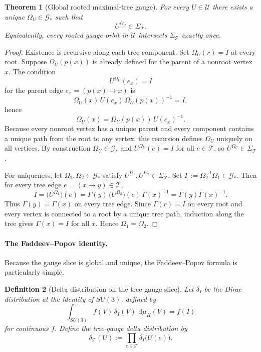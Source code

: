 \documentclass[11pt]{article}
\newtheorem{theorem}{Theorem}[section]
\newtheorem{definition}[theorem]{Definition}
\theoremstyle{remark}
\newcommand{\mcT}{\mathcal T}
\newcommand{\mcG}{\mathcal G}
\newcommand{\mcU}{\mathscr U}
\newcommand{\dd}{\,\mathrm d}
\begin{document}
\begin{theorem}[Global rooted maximal-tree gauge]
\label{thm:tree-gauge}
For every $U\in\mcU$ there exists a unique $\Omega_U\in\mcG_*$ such that
\[
U^{\Omega_U}\in\Sigma_{\mcT}.
\]
Equivalently, every rooted gauge orbit in $\mcU$ intersects $\Sigma_{\mcT}$
exactly once.
\end{theorem}
\begin{proof}
Existence is recursive along each tree component.  Set $\Omega_U(r)=I$ at every
root.  Suppose $\Omega_U(p(x))$ is already defined for the parent of a nonroot
vertex $x$.  The condition
\[
U^{\Omega_U}(e_x)=I
\]
for the parent edge $e_x=(p(x)\to x)$ is
\[
\Omega_U(x)\,U(e_x)\,\Omega_U(p(x))^{-1}=I,
\]
hence
\[
\Omega_U(x)=\Omega_U(p(x))\,U(e_x)^{-1}.
\]
Because every nonroot vertex has a unique parent and every component contains a
unique path from the root to any vertex, this recursion defines $\Omega_U$
uniquely on all vertices.  By construction $\Omega_U\in\mcG_*$ and
$U^{\Omega_U}(e)=I$ for all $e\in\mcT$, so $U^{\Omega_U}\in\Sigma_{\mcT}$.

For uniqueness, let $\Omega_1,\Omega_2\in\mcG_*$ satisfy
$U^{\Omega_1},U^{\Omega_2}\in\Sigma_{\mcT}$.  Set
$\Gamma:=\Omega_2^{-1}\Omega_1\in\mcG_*$.  Then for every tree edge
$e=(x\to y)\in\mcT$,
\[
I
=
\bigl(U^{\Omega_1}\bigr)(e)
=
\Gamma(y)\,\bigl(U^{\Omega_2}\bigr)(e)\,\Gamma(x)^{-1}
=
\Gamma(y)\Gamma(x)^{-1}.
\]
Thus $\Gamma(y)=\Gamma(x)$ on every tree edge.  Since $\Gamma(r)=I$ on every
root and every vertex is connected to a root by a unique tree path, induction
along the tree gives $\Gamma(x)=I$ for all $x$.  Hence $\Omega_1=\Omega_2$.
\end{proof}

\paragraph{The Faddeev--Popov identity.}
Because the gauge slice is global and unique, the Faddeev--Popov formula is
particularly simple.

\begin{definition}[Delta distribution on the tree gauge slice]
\label{def:delta-tree}
Let $\delta_I$ be the Dirac distribution at the identity of $SU(3)$, defined by
\[
\int_{SU(3)}f(V)\,\delta_I(V)\,\dd\mu_H(V)=f(I)
\]
for continuous $f$.  Define the tree-gauge delta distribution by
\[
\delta_{\mcT}(U):=\prod_{e\in\mcT}\delta_I\!\bigl(U(e)\bigr).
\]
\end{definition}
\end{document}
